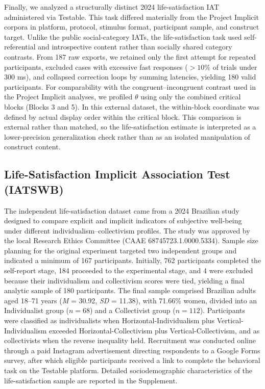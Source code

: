 \documentclass[12pt]{article}
\begin{document}
Finally, we analyzed a structurally distinct 2024 life-satisfaction IAT administered via Testable. This task differed materially from the Project Implicit corpora in platform, protocol, stimulus format, participant sample, and construct target. Unlike the public social-category IATs, the life-satisfaction task used self-referential and introspective content rather than socially shared category contrasts. From 187 raw exports, we retained only the first attempt for repeated participants, excluded cases with excessive fast responses ($>10\%$ of trials under 300 ms), and collapsed correction loops by summing latencies, yielding 180 valid participants. For comparability with the congruent--incongruent contrast used in the Project Implicit analyses, we profiled $\theta$ using only the combined critical blocks (Blocks 3 and 5). In this external dataset, the within-block coordinate was defined by actual display order within the critical block. This comparison is external rather than matched, so the life-satisfaction estimate is interpreted as a lower-precision generalization check rather than as an isolated manipulation of construct content.

\subsection*{Life-Satisfaction Implicit Association Test (IATSWB)}

The independent life-satisfaction dataset came from a 2024 Brazilian study designed to compare explicit and implicit indicators of subjective well-being under different individualism--collectivism profiles. The study was approved by the local Research Ethics Committee (CAAE 68745723.1.0000.5334). Sample size planning for the original experiment targeted two independent groups and indicated a minimum of 167 participants. Initially, 762 participants completed the self-report stage, 184 proceeded to the experimental stage, and 4 were excluded because their individualism and collectivism scores were tied, yielding a final analytic sample of 180 participants. The final sample comprised Brazilian adults aged 18--71 years (\textit{M} = 30.92, \textit{SD} = 11.38), with 71.66\% women, divided into an Individualist group ($n=68$) and a Collectivist group ($n=112$). Participants were classified as individualists when Horizontal-Individualism plus Vertical-Individualism exceeded Horizontal-Collectivism plus Vertical-Collectivism, and as collectivists when the reverse inequality held. Recruitment was conducted online through a paid Instagram advertisement directing respondents to a Google Forms survey, after which eligible participants received a link to complete the behavioral task on the Testable platform. Detailed sociodemographic characteristics of the life-satisfaction sample are reported in the Supplement.
\end{document}
